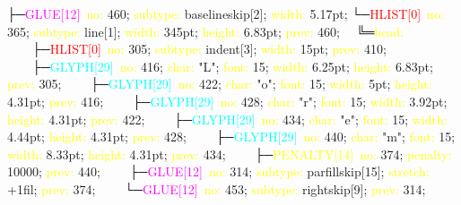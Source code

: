 \documentclass{article}
\begin{document}
\tiny
\setmonofont{DejaVu Sans Mono}
\ttfamily
  ├─\textcolor{magenta}{GLUE[12]\ }\textcolor{yellow}{no:} 460; \textcolor{yellow}{subtype:} baselineskip[2]; \textcolor{yellow}{width:} 5.17pt; \newline
  └─\textcolor{red}{HLIST[0]\ }\textcolor{yellow}{no:} 365; \textcolor{yellow}{subtype:} line[1]; \textcolor{yellow}{width:} 345pt; \textcolor{yellow}{height:} 6.83pt; \textcolor{yellow}{prev:} 460; \newline
  \ \ ╚═\textcolor{yellow}{head:}
  \ \ \ \ ├─\textcolor{red}{HLIST[0]\ }\textcolor{yellow}{no:} 305; \textcolor{yellow}{subtype:} indent[3]; \textcolor{yellow}{width:} 15pt; \textcolor{yellow}{prev:} 410; \newline
  \ \ \ \ ├─\textcolor{cyan}{GLYPH[29]\ }\textcolor{yellow}{no:} 416; \textcolor{yellow}{char:} "L"; \textcolor{yellow}{font:} 15; \textcolor{yellow}{width:} 6.25pt; \textcolor{yellow}{height:} 6.83pt; \textcolor{yellow}{prev:} 305; \newline
  \ \ \ \ ├─\textcolor{cyan}{GLYPH[29]\ }\textcolor{yellow}{no:} 422; \textcolor{yellow}{char:} "o"; \textcolor{yellow}{font:} 15; \textcolor{yellow}{width:} 5pt; \textcolor{yellow}{height:} 4.31pt; \textcolor{yellow}{prev:} 416; \newline
  \ \ \ \ ├─\textcolor{cyan}{GLYPH[29]\ }\textcolor{yellow}{no:} 428; \textcolor{yellow}{char:} "r"; \textcolor{yellow}{font:} 15; \textcolor{yellow}{width:} 3.92pt; \textcolor{yellow}{height:} 4.31pt; \textcolor{yellow}{prev:} 422; \newline
  \ \ \ \ ├─\textcolor{cyan}{GLYPH[29]\ }\textcolor{yellow}{no:} 434; \textcolor{yellow}{char:} "e"; \textcolor{yellow}{font:} 15; \textcolor{yellow}{width:} 4.44pt; \textcolor{yellow}{height:} 4.31pt; \textcolor{yellow}{prev:} 428; \newline
  \ \ \ \ ├─\textcolor{cyan}{GLYPH[29]\ }\textcolor{yellow}{no:} 440; \textcolor{yellow}{char:} "m"; \textcolor{yellow}{font:} 15; \textcolor{yellow}{width:} 8.33pt; \textcolor{yellow}{height:} 4.31pt; \textcolor{yellow}{prev:} 434; \newline
  \ \ \ \ ├─\textcolor{yellow}{PENALTY[14]\ }\textcolor{yellow}{no:} 374; \textcolor{yellow}{penalty:} 10000; \textcolor{yellow}{prev:} 440; \newline
  \ \ \ \ ├─\textcolor{magenta}{GLUE[12]\ }\textcolor{yellow}{no:} 314; \textcolor{yellow}{subtype:} parfillskip[15]; \textcolor{yellow}{stretch:} +1fil; \textcolor{yellow}{prev:} 374; \newline
  \ \ \ \ └─\textcolor{magenta}{GLUE[12]\ }\textcolor{yellow}{no:} 453; \textcolor{yellow}{subtype:} rightskip[9]; \textcolor{yellow}{prev:} 314; \newline
\end{document}
